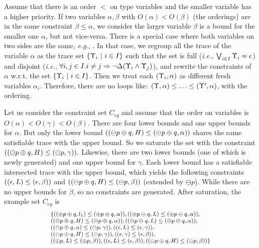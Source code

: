 {{{Assume that there is an order $<$ on type variables and the smaller variable has a higher priority.
If two variables $\alpha, \beta$ with $O(\alpha) < O (\beta)$ (the orderings) are in the same constraint $\beta \leq \alpha$, we consider the larger variable $\beta$ is a bound for the smaller one $\alpha$, but not vice-versa.
There is a special case where both variables on two sides are the same, \emph{e.g.},  .
In that case, we regroup all the trace of the variable $\alpha$ as the trace set $\{\Upsilon_i~|~i \in I\}$ such that the set is full (\emph{i.e.}, $\bigvee_{i\in I}\Upsilon_i  = \epsilon$) and disjoint (\emph{i.e.}, $\forall i,j\in I. i\neq j \Rightarrow \neg\Delta(\Upsilon_i\land\Upsilon_j)$), and rewrite the constraints of $\alpha$ w.r.t. the set $\{\Upsilon_i~|~i \in I\}$.  Then we treat each $(\Upsilon_i, \alpha)$ as different fresh variables $\alpha_i$.
Therefore, there are no loops like: $(\Upsilon,\alpha) \leq \ldots\leq (\Upsilon',\alpha)$, with the ordering.

Let us consider the constraint set $C_{eg}$ and assume that the order on variables is $O(\alpha) < O (\gamma) < O (\beta)$. There are four lower bounds and one upper bounds for $\alpha$. But only the lower bound $((\ominus p\oplus q,H)\leq(\ominus p\oplus q,\alpha))$ shares the same satisfiable trace with the upper bound.
So we saturate the set with the constraint $((\ominus p\oplus q,H)\leq(\ominus p,\gamma)).$
Likewise, there are two lower bounds (one of which is newly generated) and one upper bound for $\gamma$. Each lower bound has a satisfiable intersected trace with the upper bound, which yields the following constraints $((\epsilon,L)\leq(\epsilon,\beta))$ and $((\ominus p\oplus q,H)\leq(\ominus p,\beta))$ (extended by $\ominus p$).
While there are no upper bounds for $\beta$, so no constraints are generated.
After saturation, the example set $C_{eg}$ is
\[
{\footnotesize
\begin{array}{l}
\{((\oplus p\oplus q,l_1)\leq(\oplus p\oplus q,\alpha)), ((\oplus p\ominus q,L)\leq(\oplus p\ominus q,\alpha)), \\
((\ominus p\oplus q,H)\leq(\ominus p\oplus q,\alpha)),
((\ominus p\ominus q,L)\leq(\ominus p\ominus q,\alpha)),\\
((\ominus p\oplus q,\alpha)\leq(\ominus p,\gamma)),
((\epsilon,L)\leq(\epsilon,\gamma)),\\
((\ominus p\oplus q,H)\leq(\ominus p,\gamma)),
((\epsilon,\gamma)\leq(\epsilon,\beta)), \\
((\oplus p,L)\leq(\oplus p,\beta)),
((\epsilon,L)\leq(\epsilon,\beta)),
((\ominus p\oplus q,H)\leq(\ominus p,\beta))
\}
\end{array}
}
\]


}}}
